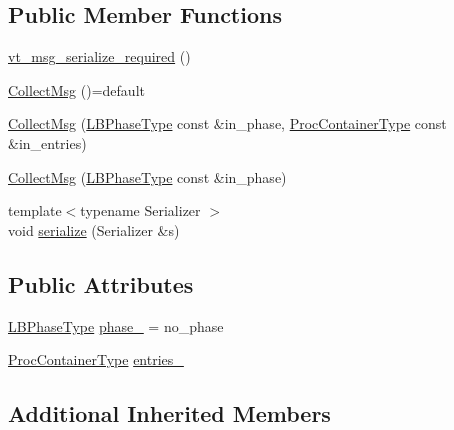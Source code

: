 \subsection*{Public Member Functions}
\begin{DoxyCompactItemize}
\item 
\hyperlink{structvt_1_1lb_1_1instrumentation_1_1_collect_msg_aa9ba0dcf462b052ecc835b9d530600ba}{vt\+\_\+msg\+\_\+serialize\+\_\+required} ()
\item 
\hyperlink{structvt_1_1lb_1_1instrumentation_1_1_collect_msg_a00aba7d5ef8b2e803775b13ace386e60}{Collect\+Msg} ()=default
\item 
\hyperlink{structvt_1_1lb_1_1instrumentation_1_1_collect_msg_a439937ef5646dc7d2b8be0dd68a9f2cf}{Collect\+Msg} (\hyperlink{namespacevt_a5505d0bab25ce2ff566a8e015871b379}{L\+B\+Phase\+Type} const \&in\+\_\+phase, \hyperlink{namespacevt_1_1lb_af7c6ee21a7b3966b7ab64c5b626d30f8}{Proc\+Container\+Type} const \&in\+\_\+entries)
\item 
\hyperlink{structvt_1_1lb_1_1instrumentation_1_1_collect_msg_ab7d73ed0bc6680b4c214aa2e44705d16}{Collect\+Msg} (\hyperlink{namespacevt_a5505d0bab25ce2ff566a8e015871b379}{L\+B\+Phase\+Type} const \&in\+\_\+phase)
\item 
{\footnotesize template$<$typename Serializer $>$ }\\void \hyperlink{structvt_1_1lb_1_1instrumentation_1_1_collect_msg_a0c499ea8b5dea147b7c1808400b2c77a}{serialize} (Serializer \&s)
\end{DoxyCompactItemize}
\subsection*{Public Attributes}
\begin{DoxyCompactItemize}
\item 
\hyperlink{namespacevt_a5505d0bab25ce2ff566a8e015871b379}{L\+B\+Phase\+Type} \hyperlink{structvt_1_1lb_1_1instrumentation_1_1_collect_msg_abb032f5e30ac3cb1c9973b360ec75634}{phase\+\_\+} = no\+\_\+phase
\item 
\hyperlink{namespacevt_1_1lb_af7c6ee21a7b3966b7ab64c5b626d30f8}{Proc\+Container\+Type} \hyperlink{structvt_1_1lb_1_1instrumentation_1_1_collect_msg_a4431d40e13ec74c0efaef51d45e5feb0}{entries\+\_\+}
\end{DoxyCompactItemize}
\subsection*{Additional Inherited Members}


